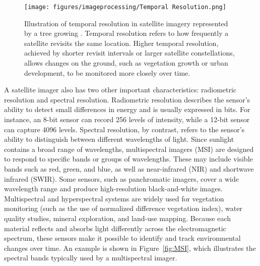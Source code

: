 \begin{figure}[H]
    \centering
    \texttt{[image: figures/imageprocessing/Temporal Resolution.png]}
    \caption{Illustration of temporal resolution in satellite imagery represented by a tree growing \cite{Tree}. Temporal resolution refers to how frequently a satellite revisits the same location. Higher temporal resolution, achieved by shorter revisit intervals or larger satellite constellations, allows changes on the ground, such as vegetation growth or urban development, to be monitored more closely over time.}
    \label{fig:TempRes}
\end{figure}

\noindent
A satellite imager also has two other important characteristics: radiometric resolution and spectral resolution. 
Radiometric resolution describes the sensor's ability to detect small differences in energy and is usually expressed in bits. 
For instance, an 8-bit sensor can record 256 levels of intensity, while a 12-bit sensor can capture 4096 levels. 
Spectral resolution, by contrast, refers to the sensor's ability to distinguish between different wavelengths of light. 
Since sunlight contains a broad range of wavelengths, multispectral imagers (MSI) are designed to respond to specific bands or groups of wavelengths. 
These may include visible bands such as red, green, and blue, as well as near-infrared (NIR) and shortwave infrared (SWIR). 
Some sensors, such as panchromatic imagers, cover a wide wavelength range and produce high-resolution black-and-white images. 
Multispectral and hyperspectral systems are widely used for vegetation monitoring (such as the use of normalized difference vegetation index), water quality studies, mineral exploration, and land-use mapping. 
Because each material reflects and absorbs light differently across the electromagnetic spectrum, these sensors make it possible to identify and track environmental changes over time. 
An example is shown in Figure~\ref{fig:MSI}, which illustrates the spectral bands typically used by a multispectral imager.


